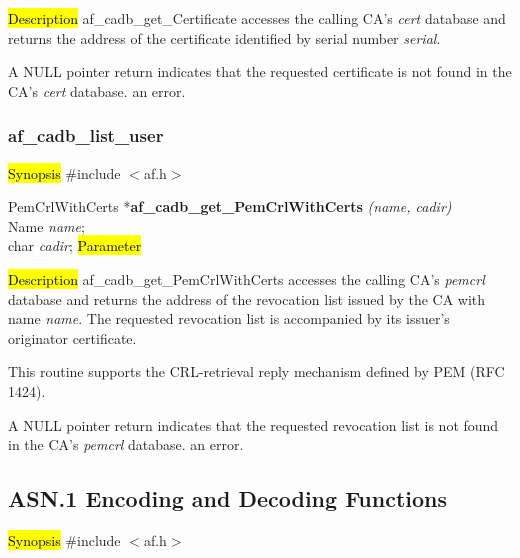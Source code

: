 
\hl{Description}
af\_cadb\_get\_Certificate accesses the calling CA's {\em cert} database and returns the address of 
the certificate identified by serial number {\em serial}. 

A NULL pointer return indicates
\bi
\m that the requested certificate is not found in the CA's {\em cert} database.
\m an error.
\ei



\subsubsection{af\_cadb\_list\_user}
\label{af_cadb_get_PemCrlWithCerts}
\hl{Synopsis}
\#include $<$af.h$>$

PemCrlWithCerts *{\bf af\_cadb\_get\_PemCrlWithCerts} {\em (name, cadir)} \\
Name	{\em *name}; \\
char	{\em *cadir};
\hl{Parameter}


\hl{Description}
af\_cadb\_get\_PemCrlWithCerts accesses the calling CA's {\em pemcrl} database and returns the 
address of the revocation list issued by the CA with name {\em name}. The requested revocation list
is accompanied by its issuer's originator certificate.

This routine supports the CRL-retrieval reply mechanism defined by PEM (RFC 1424).

A NULL pointer return indicates
\bi
\m that the requested revocation list is not found in the CA's {\em pemcrl} database.
\m an error.
\ei


\subsection{ASN.1 Encoding and Decoding Functions}
\label{af_cadb_get_user}
\hl{Synopsis}
\#include $<$af.h$>$

